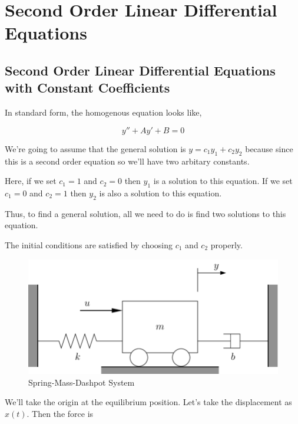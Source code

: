 

\chapter{Second Order Linear Differential Equations} 

\bigbreak

\section{Second Order Linear Differential Equations with Constant Coefficients}

In standard form, the homogenous equation looks like,

$$ y'' + Ay' + B = 0 $$

We're going to assume that the general solution is $ y = c_1 y_1 + c_2 y_2 $ 
because since this is a second order equation so we'll have two arbitary constants.

Here, if we set $c_1 = 1$ and $c_2 = 0$ then $y_1$ is a solution to this equation.
If we set $c_1 = 0$ and $c_2 = 1$ then $y_2$ is also a solution to this equation.

Thus, to find a general solution, all we need to do is find two solutions to this equation.

The initial conditions are satisfied by choosing $c_1$ and $c_2$ properly.

\begin{figure}[ht!]
    \centering
    \includegraphics[scale=0.3]{./images/lecture_9_figure_1.png}
    \caption{Spring-Mass-Dashpot System}
\end{figure}

We'll take the origin at the equilibrium position.
Let's take the displacement as $x(t)$. Then the force is 

